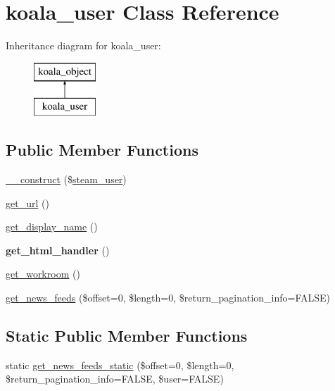 \hypertarget{classkoala__user}{
\section{koala\_\-user Class Reference}
\label{classkoala__user}
}
Inheritance diagram for koala\_\-user:\begin{figure}[H]
\begin{center}
\leavevmode
\includegraphics[height=2.000000cm]{classkoala__user}
\end{center}
\end{figure}
\subsection*{Public Member Functions}
\begin{DoxyCompactItemize}
\item 
\hyperlink{classkoala__user_a1845f3a4bdf251ae29c85f9b392fd308}{\_\-\_\-construct} (\$\hyperlink{classsteam__user}{steam\_\-user})
\item 
\hyperlink{classkoala__user_a3d829d588ab3d2ffa9c6a0eceb689224}{get\_\-url} ()
\item 
\hyperlink{classkoala__user_a92c542ef9d65c2b6411417abd2e7a204}{get\_\-display\_\-name} ()
\item 
\hypertarget{classkoala__user_a00431960383f2a00a06e99ca26bcac67}{
{\bfseries get\_\-html\_\-handler} ()}
\label{classkoala__user_a00431960383f2a00a06e99ca26bcac67}

\item 
\hyperlink{classkoala__user_a5f1be0eead568230b3ffc086f8db9ac5}{get\_\-workroom} ()
\item 
\hyperlink{classkoala__user_a80b6c7bdfeb57166873abf260eedf984}{get\_\-news\_\-feeds} (\$offset=0, \$length=0, \$return\_\-pagination\_\-info=FALSE)
\end{DoxyCompactItemize}
\subsection*{Static Public Member Functions}
\begin{DoxyCompactItemize}
\item 
static \hyperlink{classkoala__user_a4d66b8f1e4ed229ee1df135bbfe077d3}{get\_\-news\_\-feeds\_\-static} (\$offset=0, \$length=0, \$return\_\-pagination\_\-info=FALSE, \$user=FALSE)
\end{DoxyCompactItemize}
